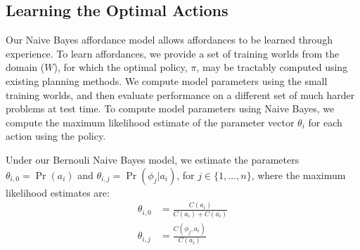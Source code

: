 \documentclass[letterpaper]{article}
\begin{document}
\subsection{Learning the Optimal Actions}
Our Naive Bayes affordance model allows affordances to be learned
through experience.  To learn affordances, we provide a set of
training worlds from the domain ($W$), for which the optimal policy,
$\pi$, may be tractably computed using existing planning methods.  We
compute model parameters using the small training worlds, and then
evaluate performance on a different set of much harder problems at
test time.  To compute model parameters using Naive Bayes, we compute
the maximum likelihood estimate of the parameter vector $\theta_i$ for
each action using the policy.

Under our Bernouli Naive Bayes model, we estimate the parameters
$\theta_{i,0} = \Pr(a_i)$ and $\theta_{i,j} = \Pr(\phi_j | a_i)$, for $j \in \{1, \ldots, n \}$, where the maximum likelihood estimates are:
\begin{align}
\theta_{i,0} &= \frac{C(a_i)}{C(a_i) + C(\bar{a_i})} \\
\theta_{i,j} &= \frac{C(\phi_j, a_i)}{C(a_i)}
\end{align}
\end{document}
